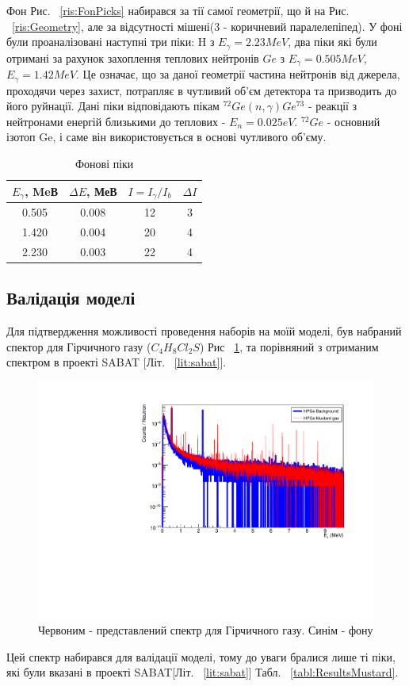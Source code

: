 \documentclass[a4paper, 14pt]{article}
\numberwithin{equation}{section}
\numberwithin{table}{section}
\begin{document}
Фон Рис. ~\ref{ris:FonPicks} набирався за тії самої геометрії, що й на Рис. ~\ref{ris:Geometry}, але за відсутності мішені(3 - коричневий паралелепіпед). У фоні були проаналізовані наступні три піки: H з $E_\gamma = 2.23 MeV$, два піки які були отримані за рахунок захоплення теплових нейтронів $Ge$ з $E_\gamma = 0.505MeV$, $E_\gamma = 1.42 MeV$. Це означає, що за даної геометрії частина нейтронів від джерела, проходячи через захист, потрапляє в чутливий об'єм детектора та призводить до його руйнації. Дані піки відповідають пікам $^{72}Ge(n, \gamma)Ge^{73}$ - реакції з нейтронами енергій близькими до теплових - $E_n = 0.025eV$. $^{72}Ge$ - основний ізотоп Ge, і саме він використовується в основі чутливого об'єму.
\begin{table}[h]
	\centering
	\caption{Фонові піки} 
	\begin{tabular}{|c|c|c|c|} 
		\hline
		$E_{\gamma}$, MeВ & $\Delta{E}$, МеВ & $I = I_{\gamma} / I_{b}$ & $\Delta{I}$\\
		\hline
		0.505 & 0.008 & 12 & 3 \\
		\hline
		1.420 & 0.004 & 20 & 4 \\	
		\hline
		2.230 & 0.003 & 22 & 4 \\	
		\hline
	\end{tabular}
	\label{tabl:ResultsBackground}
\end{table}

\subsection{Валідація моделі}

Для підтвердження можливості проведення наборів на моїй моделі, був набраний спектор для Гірчичного газу ($C_4H_8Cl_2S$) Рис ~\ref{ris:MustBackAllLogSm}, та порівняний з отриманим спектром в проекті SABAT [Літ. ~\ref{lit:sabat}].
\begin{figure}[hbt!]
	\centering \includegraphics[width=1\textwidth]{res/smMustFonAll.pdf}
	\caption{Червоним - представлений спектр для Гірчичного газу. Синім - фону} 
	\label{ris:MustBackAllLogSm}	
\end{figure} 
Цей спектр набирався для валідації моделі, тому до уваги бралися лише ті піки, які були вказані в проекті SABAT[Літ. ~\ref{lit:sabat}] Табл. ~\ref{tabl:ResultsMustard}.
\end{document}
